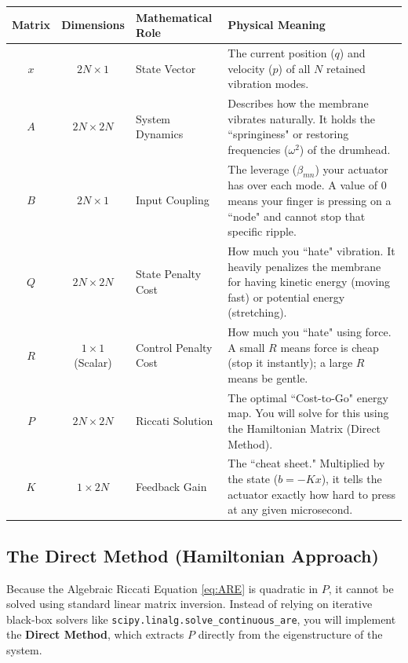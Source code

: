 \documentclass[11pt]{article}
\begin{document}
\begin{table}[h]
\centering
\renewcommand{\arraystretch}{1.5}
\begin{tabular}{|c|c|p{4.5cm}|p{6cm}|}
\hline
\textbf{Matrix} & \textbf{Dimensions} & \textbf{Mathematical Role} & \textbf{Physical Meaning} \\ \hline
$x$ & $2N \times 1$ & State Vector & The current position ($q$) and velocity ($p$) of all $N$ retained vibration modes. \\ \hline
$A$ & $2N \times 2N$ & System Dynamics & Describes how the membrane vibrates naturally. It holds the “springiness" or restoring frequencies ($\omega^2$) of the drumhead. \\ \hline
$B$ & $2N \times 1$ & Input Coupling & The leverage ($\beta_{mn}$) your actuator has over each mode. A value of $0$ means your finger is pressing on a “node" and cannot stop that specific ripple. \\ \hline
$Q$ & $2N \times 2N$ & State Penalty Cost & How much you “hate" vibration. It heavily penalizes the membrane for having kinetic energy (moving fast) or potential energy (stretching). \\ \hline
$R$ & $1 \times 1$ (Scalar) & Control Penalty Cost & How much you “hate" using force. A small $R$ means force is cheap (stop it instantly); a large $R$ means be gentle. \\ \hline
$P$ & $2N \times 2N$ & Riccati Solution & The optimal “Cost-to-Go" energy map. You will solve for this using the Hamiltonian Matrix (Direct Method). \\ \hline
$K$ & $1 \times 2N$ & Feedback Gain & The “cheat sheet." Multiplied by the state ($b = -Kx$), it tells the actuator exactly how hard to press at any given microsecond. \\ \hline
\end{tabular}
\vspace{0.2cm}
\end{table}

\subsection{The Direct Method (Hamiltonian Approach)}
Because the Algebraic Riccati Equation \eqref{eq:ARE} is quadratic in $P$, it cannot be solved using standard linear matrix inversion. Instead of relying on iterative black-box solvers like \texttt{scipy.linalg.solve\_continuous\_are}, you will implement the \textbf{Direct Method}, which extracts $P$ directly from the eigenstructure of the system.
\end{document}
